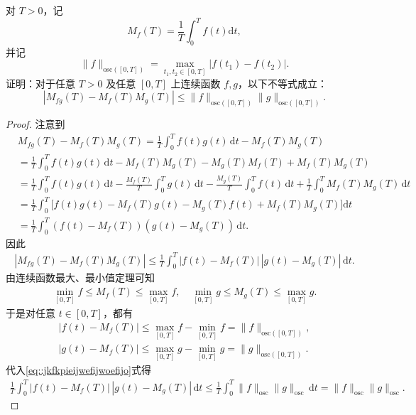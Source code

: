 \documentclass[../../main.tex]{subfiles}%
\begin{document}
\begin{example}
对 \(T > 0\)，记
\[
M_f(T) = \frac{1}{T} \int_0^T f(t) \mathrm{d}t,
\]
并记
\[
\|f\|_{\mathrm{osc}([0,T])} = \max_{t_1,t_2 \in [0,T]} |f(t_1) - f(t_2)|.
\]
证明：对于任意 \(T > 0\) 及任意 \([0,T]\) 上连续函数 \(f,g\)，以下不等式成立：
\[
|M_{fg}(T) - M_f(T)M_g(T)| \leqslant \|f\|_{\mathrm{osc}([0,T])} \|g\|_{\mathrm{osc}([0,T])}.
\]
\end{example}
\begin{proof}
注意到
\begin{align*}
&M_{fg}\left( T \right) -M_f(T)M_g(T)=\frac{1}{T}\int_0^T{f\left( t \right) g\left( t \right) \,\mathrm{d}t}-M_f(T)M_g(T)\\
&=\frac{1}{T}\int_0^T{f\left( t \right) g\left( t \right) \,\mathrm{d}t}-M_f(T)M_g(T)-M_g(T)M_f(T)+M_f(T)M_g(T)
\\
&=\frac{1}{T}\int_0^T{f\left( t \right) g\left( t \right) \,\mathrm{d}t}-\frac{M_f(T)}{T}\int_0^T{g\left( t \right) \,\mathrm{d}t}-\frac{M_g(T)}{T}\int_0^T{f\left( t \right) \,\mathrm{d}t}+\frac{1}{T}\int_0^T{M_f(T)M_g(T)\,\mathrm{d}t}
\\
&=\frac{1}{T}\int_0^T{\bigl[ f\left( t \right) g\left( t \right) -M_f(T)g\left( t \right) -M_g(T)f\left( t \right) +M_f(T)M_g(T) \bigr] \mathrm{d}t}
\\
&=\frac{1}{T}\int_0^T{\left( f\left( t \right) -M_f(T) \right) \left( g\left( t \right) -M_g(T) \right) \,\mathrm{d}t}.
\end{align*}
因此
\begin{align}\label{eq::jkfkpieijwefijwoefijo}
|M_{fg}(T) - M_f(T)M_g(T)| 
\leqslant \frac{1}{T} \int_0^T |f(t) - M_f(T)|\,|g(t) - M_g(T)|\,\mathrm{d}t.
\end{align}
由连续函数最大、最小值定理可知
\begin{align*}
\min_{[0,T]} f \leqslant M_f(T) \leqslant \max_{[0,T]} f,\quad \min_{[0,T]} g \leqslant M_g(T) \leqslant \max_{[0,T]} g.
\end{align*}
于是对任意 $t \in [0,T]$，都有
\begin{gather*}
|f(t) - M_f(T)| \leqslant \max_{[0,T]} f - \min_{[0,T]} f = \|f\|_{\mathrm{osc}([0,T])},\\
|g(t) - M_f(T)| \leqslant \max_{[0,T]} g - \min_{[0,T]} g = \|g\|_{\mathrm{osc}([0,T])}.
\end{gather*}
代入\eqref{eq::jkfkpieijwefijwoefijo}式得
\begin{align*}
\frac{1}{T} \int_0^T |f(t) - M_f(T)|\,|g(t) - M_g(T)|\,\mathrm{d}t 
\leqslant \frac{1}{T} \int_0^T \|f\|_{\mathrm{osc}} \|g\|_{\mathrm{osc}} \,\mathrm{d}t 
= \|f\|_{\mathrm{osc}} \|g\|_{\mathrm{osc}}.
\end{align*}
\end{proof}
\end{document}
